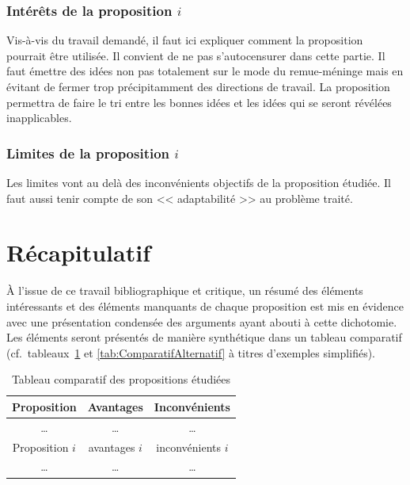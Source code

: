 \documentclass[11pt, french]{report-rd-info}
\begin{document}
\subsubsection{Intérêts de la proposition $i$}

Vis-à-vis du travail demandé, il faut ici expliquer comment la proposition pourrait être utilisée. Il convient de ne pas s'autocensurer dans cette partie. Il faut émettre des idées non pas totalement sur le mode du remue-méninge mais en évitant de fermer trop précipitamment des directions de travail. La proposition permettra de faire le tri entre les bonnes idées et les idées qui se seront révélées inapplicables.

\subsubsection{Limites de la proposition $i$}

Les limites vont au delà des inconvénients objectifs de la proposition étudiée. Il faut aussi tenir compte de son << adaptabilité >> au problème traité.

\section{Récapitulatif}

À l'issue de ce travail bibliographique et critique, un résumé des éléments intéressants et des éléments manquants de chaque proposition est mis en évidence avec une présentation condensée des arguments ayant abouti à cette dichotomie. Les éléments seront présentés de manière synthétique dans un tableau comparatif (cf.\ tableaux~\ref{tab:Comparatif} et \ref{tab:ComparatifAlternatif} à titres d'exemples simplifiés).

\begin{table}
    \begin{center}
        \begin{tabular}{|c||c|c|}
            \hline
            Proposition & Avantages & Inconvénients \\
            \hline
            \hline
            \ldots & \ldots & \ldots\\
            \hline
            Proposition $i$ & avantages $i$ & inconvénients $i$\\
            \hline
            \ldots & \ldots & \ldots\\
            \hline
        \end{tabular}
    \end{center}
    \caption{Tableau comparatif des propositions étudiées}
    \label{tab:Comparatif}
\end{table}
\end{document}
